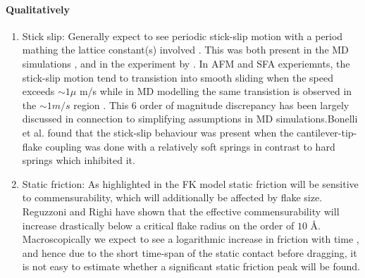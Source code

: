 \paragraph*{Qualitatively}
\begin{enumerate}
  \item Stick slip: Generally expect to see periodic stick-slip motion with a period mathing the lattice constant(s) involved \cite{mo_friction_2009}. This was both present in the MD simulations \cite{zhu_study_2018}, \cite{ma12091425} and in the experiment by \cite{DIENWIEBEL2005197}. In AFM and SFA experiemnts, the stick-slip motion tend to transistion into smooth sliding when the speed exceeds $\sim 1 \mu$ m/s while in MD modelling the same transistion is observed in the $\sim 1 m/s$ region \cite{Manini_2016}. This 6 order of magnitude discrepancy has been largely discussed in connection to simplifying assumptions in MD simulations.Bonelli et al. \cite{bonelli_atomistic_2009} found that the stick-slip behaviour was present when the cantilever-tip-flake coupling was done with a relatively soft springs in contrast to hard springs which inhibited it.   

  \item Static friction: As highlighted in the FK model static friction will be sensitive to commensurability, which will additionally be affected by flake size. Reguzzoni and Righi \cite{PhysRevB.85.201412} have shown that the effective commensurability will increase drastically below a critical flake radius on the order of $10$ Å. Macroscopically we expect to see a logarithmic increase in friction with time \cite{dieterich_1972}, and hence due to the short time-span of the static contact before dragging, it is not easy to estimate whether a significant static friction peak will be found. 
  



  

\end{enumerate}
